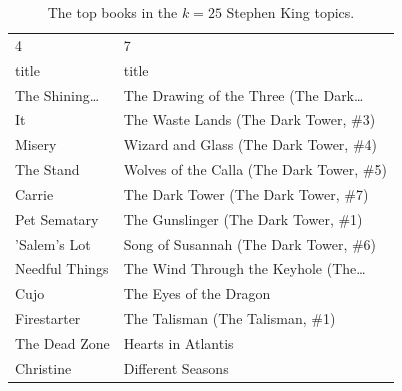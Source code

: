 \documentclass[handout]{beamer}
\begin{document}
\begin{frame}
 
\begin{table}[p]
\centering
\begin{tabular}{ll}
\toprule
                            4 &                                                  7 \\
                        title &                                              title \\
\midrule
 The Shining\ldots%
 &      The Drawing of the Three (The Dark\ldots%
  \\
                           It &               The Waste Lands (The Dark Tower, \#3) \\
                       Misery &              Wizard and Glass (The Dark Tower, \#4) \\
                    The Stand &           Wolves of the Calla (The Dark Tower, \#5) \\
                       Carrie &                The Dark Tower (The Dark Tower, \#7) \\
                 Pet Sematary &                The Gunslinger (The Dark Tower, \#1) \\
                 'Salem's Lot &              Song of Susannah (The Dark Tower, \#6) \\
               Needful Things &  The Wind Through the Keyhole (The\ldots%
               \\
                         Cujo &                             The Eyes of the Dragon \\
                  Firestarter &                    The Talisman (The Talisman, \#1) \\
                The Dead Zone &                                 Hearts in Atlantis \\
                    Christine &                                  Different Seasons \\
\bottomrule
\end{tabular}
  \caption[Stephen King ($k=25$)]{The top books in the $k=25$ Stephen King topics.}
\end{table}

\end{frame}
\end{document}
